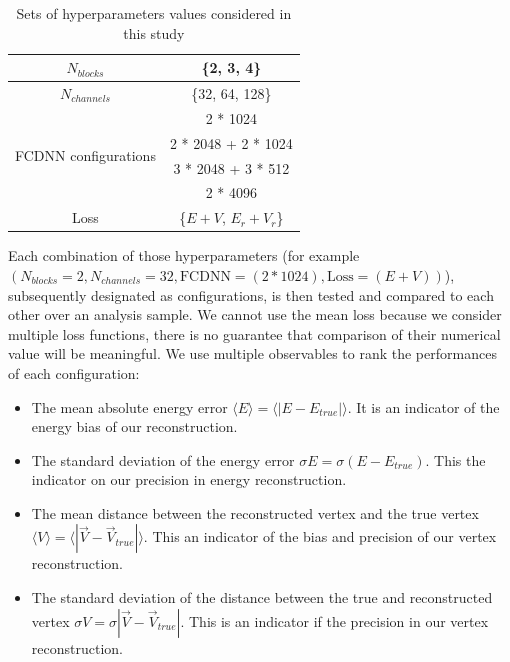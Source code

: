 \begin{table}[ht]
  \centering
  \begin{tabular}{ | c | c | }
    \hline $N_{blocks}$ & \{2, 3, 4\} \\
    \hline $N_{channels}$ & \{32, 64, 128\} \\
    \hline
    \multirow{4}{*}{FCDNN configurations} & 2 * 1024 \\
                                        & 2 * 2048 + 2 * 1024 \\
                                        & 3 * 2048 + 3 * 512 \\
                                        & 2 * 4096 \\
    \hline
    Loss & \{$E+V$, $E_r + V_r$\} \\
    \hline
  \end{tabular}
  \caption{Sets of hyperparameters values considered in this study}
  \label{tab:jcnn:hyper}
\end{table}

Each combination of those hyperparameters (for example $(N_{blocks} = 2, N_{channels} = 32, \mathrm{FCDNN} = (2 * 1024), \mathrm{Loss} = (E+V))$), subsequently designated as configurations, is then tested and compared to each other over an analysis sample. We cannot use the mean loss because we consider multiple loss functions, there is no guarantee that comparison of their numerical value will be meaningful. We use multiple observables to rank the performances of each configuration:
\begin{itemize}
  \item The mean absolute energy error $\langle E \rangle = \langle | E - E_{true} | \rangle$. It is an indicator of the energy bias of our reconstruction.
  \item The standard deviation of the energy error $\sigma E = \sigma (E - E_{true})$. This the indicator on our precision in energy reconstruction.
  \item The mean distance between the reconstructed vertex and the true vertex $\langle V \rangle = \langle | \vec{V} - \vec{V}_{true} | \rangle$. This an indicator of the bias and precision of our vertex reconstruction.
  \item The standard deviation of the distance between the true and reconstructed vertex $\sigma V = \sigma |\vec{V} - \vec{V}_{true}|$. This is an indicator if the precision in our vertex reconstruction.
\end{itemize}


